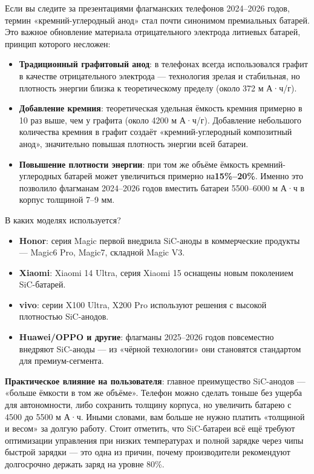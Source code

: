 
Если вы следите за презентациями флагманских телефонов 2024–2026 годов, термин «кремний-углеродный анод» стал почти синонимом премиальных батарей. Это важное обновление материала отрицательного электрода литиевых батарей, принцип которого несложен:

\begin{itemize}
  \item \textbf{Традиционный графитовый анод}: в телефонах всегда использовался графит в качестве отрицательного электрода — технология зрелая и стабильная, но плотность энергии близка к теоретическому пределу (около 372 м А·ч/г).
  \item \textbf{Добавление кремния}: теоретическая удельная ёмкость кремния примерно в 10 раз выше, чем у графита (около 4200 м А·ч/г). Добавление небольшого количества кремния в графит создаёт «кремний-углеродный композитный анод», значительно повышая плотность энергии всей батареи.
  \item \textbf{Повышение плотности энергии}: при том же объёме ёмкость кремний-углеродных батарей может увеличиться примерно на\textbf{15\%–20\%}. Именно это позволило флагманам 2024–2026 годов вместить батареи 5500–6000 м А·ч в корпус толщиной 7–9 мм.
\end{itemize}

\begin{tcbinfo}{В каких моделях используется?}
\begin{itemize}
  \item \textbf{Honor}: серия Magic первой внедрила SiC-аноды в коммерческие продукты — Magic6 Pro, Magic7, складной Magic V3.
  \item \textbf{Xiaomi}: Xiaomi 14 Ultra, серия Xiaomi 15 оснащены новым поколением SiC-батарей.
  \item \textbf{vivo}: серии X100 Ultra, X200 Pro используют решения с высокой плотностью SiC-анодов.
  \item \textbf{Huawei/OPPO и другие}: флагманы 2025–2026 годов повсеместно внедряют SiC-аноды — из «чёрной технологии» они становятся стандартом для премиум-сегмента.
\end{itemize}

\end{tcbinfo}

\textbf{Практическое влияние на пользователя}: главное преимущество SiC-анодов — «больше ёмкости в том же объёме». Телефон можно сделать тоньше без ущерба для автономности, либо сохранить толщину корпуса, но увеличить батарею с 4500 до 5500 м А·ч. Иными словами, вам больше не нужно платить «толщиной и весом» за долгую работу. Стоит отметить, что SiC-батареи всё ещё требуют оптимизации управления при низких температурах и полной зарядке через чипы быстрой зарядки — это одна из причин, почему производители рекомендуют долгосрочно держать заряд на уровне 80\%.

